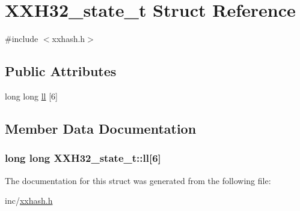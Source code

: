\hypertarget{struct_x_x_h32__state__t}{}\section{X\+X\+H32\+\_\+state\+\_\+t Struct Reference}
\label{struct_x_x_h32__state__t}


{\ttfamily \#include $<$xxhash.\+h$>$}

\subsection*{Public Attributes}
\begin{DoxyCompactItemize}
\item 
long long \hyperlink{struct_x_x_h32__state__t_aa403a337d57bf3ae25092199ff57b8ee}{ll} \mbox{[}6\mbox{]}
\end{DoxyCompactItemize}


\subsection{Member Data Documentation}
\hypertarget{struct_x_x_h32__state__t_aa403a337d57bf3ae25092199ff57b8ee}{}
\subsubsection[{ll}]{\setlength{\rightskip}{0pt plus 5cm}long long X\+X\+H32\+\_\+state\+\_\+t\+::ll\mbox{[}6\mbox{]}}\label{struct_x_x_h32__state__t_aa403a337d57bf3ae25092199ff57b8ee}


The documentation for this struct was generated from the following file\+:\begin{DoxyCompactItemize}
\item 
inc/\hyperlink{xxhash_8h}{xxhash.\+h}\end{DoxyCompactItemize}
